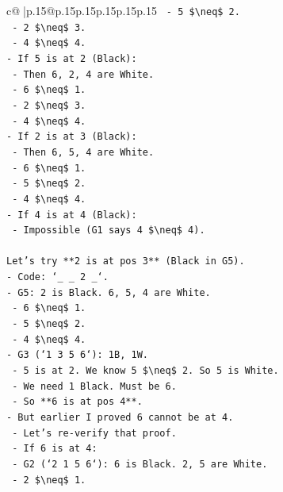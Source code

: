\documentclass{article}
\begin{document}
{\begin{supertabular}{c@{$\;$}|p{.15\linewidth}@{}p{.15\linewidth}p{.15\linewidth}p{.15\linewidth}p{.15\linewidth}p{.15\linewidth}}
{{{\texttt{  {-} 5 \$\textbackslash{}neq\$ 2.} \\
\texttt{  {-} 2 \$\textbackslash{}neq\$ 3.} \\
\texttt{  {-} 4 \$\textbackslash{}neq\$ 4.} \\
\texttt{{-} If 5 is at 2 (Black):} \\
\texttt{  {-} Then 6, 2, 4 are White.} \\
\texttt{  {-} 6 \$\textbackslash{}neq\$ 1.} \\
\texttt{  {-} 2 \$\textbackslash{}neq\$ 3.} \\
\texttt{  {-} 4 \$\textbackslash{}neq\$ 4.} \\
\texttt{{-} If 2 is at 3 (Black):} \\
\texttt{  {-} Then 6, 5, 4 are White.} \\
\texttt{  {-} 6 \$\textbackslash{}neq\$ 1.} \\
\texttt{  {-} 5 \$\textbackslash{}neq\$ 2.} \\
\texttt{  {-} 4 \$\textbackslash{}neq\$ 4.} \\
\texttt{{-} If 4 is at 4 (Black):} \\
\texttt{  {-} Impossible (G1 says 4 \$\textbackslash{}neq\$ 4).} \\
\\ 
\texttt{Let's try **2 is at pos 3** (Black in G5).} \\
\texttt{{-} Code: `\_ \_ 2 \_`.} \\
\texttt{{-} G5: 2 is Black. 6, 5, 4 are White.} \\
\texttt{  {-} 6 \$\textbackslash{}neq\$ 1.} \\
\texttt{  {-} 5 \$\textbackslash{}neq\$ 2.} \\
\texttt{  {-} 4 \$\textbackslash{}neq\$ 4.} \\
\texttt{{-} G3 (`1 3 5 6`): 1B, 1W.} \\
\texttt{  {-} 5 is at 2. We know 5 \$\textbackslash{}neq\$ 2. So 5 is White.} \\
\texttt{  {-} We need 1 Black. Must be 6.} \\
\texttt{  {-} So **6 is at pos 4**.} \\
\texttt{{-} But earlier I proved 6 cannot be at 4.} \\
\texttt{  {-} Let's re{-}verify that proof.} \\
\texttt{  {-} If 6 is at 4:} \\
\texttt{    {-} G2 (`2 1 5 6`): 6 is Black. 2, 5 are White.} \\
\texttt{      {-} 2 \$\textbackslash{}neq\$ 1.} \\
}}}
\end{supertabular}}
\end{document}
